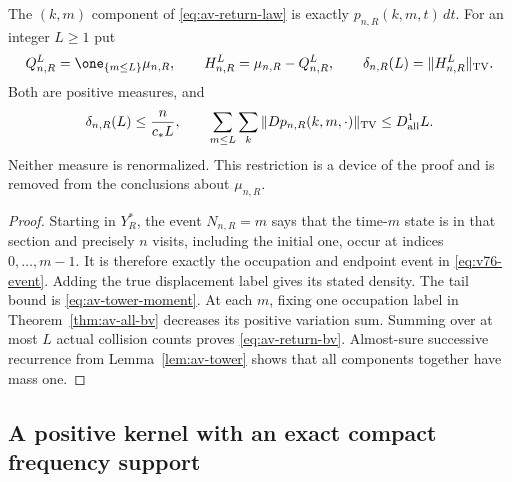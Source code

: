 \begin{lemma}
\label{lem:av-return-components}
The $(k,m)$ component of \eqref{eq:av-return-law} is exactly
$p_{n,R}(k,m,t)\,dt$.  For an integer $L\ge1$ put
\[
 Q_{n,R}^{L}=\one_{\{m\le L\}}\mu_{n,R},\qquad
 H_{n,R}^{L}=\mu_{n,R}-Q_{n,R}^{L},\qquad
 \delta_{n,R}(L)=\|H_{n,R}^{L}\|_{\rm TV}.
\]
Both are positive measures, and
\begin{equation}\label{eq:av-return-bv}
 \delta_{n,R}(L)\le\frac{n}{c_*L},\qquad
 \sum_{m\le L}\sum_k\|D p_{n,R}(k,m,\cdot)\|_{\rm TV}
                  \le D_{\rm all}^{1}L.
\end{equation}
Neither measure is renormalized.  This restriction is a device of
the proof and is removed from the conclusions about $\mu_{n,R}$.
\end{lemma}
\begin{proof}
Starting in $Y_R^*$, the event $N_{n,R}=m$ says that the time-$m$
state is in that section and precisely $n$ visits, including the
initial one, occur at indices $0,\ldots,m-1$.  It is therefore
exactly the occupation and endpoint event in \eqref{eq:v76-event}.
Adding the true displacement label gives its stated density.  The
tail bound is \eqref{eq:av-tower-moment}.  At each $m$, fixing one
occupation label in Theorem~\ref{thm:av-all-bv} decreases its positive
variation sum.  Summing over at most $L$ actual collision counts
proves \eqref{eq:av-return-bv}.  Almost-sure successive recurrence
from Lemma~\ref{lem:av-tower} shows that all components together
have mass one.
\end{proof}

\subsection{A positive kernel with an exact compact frequency support}

